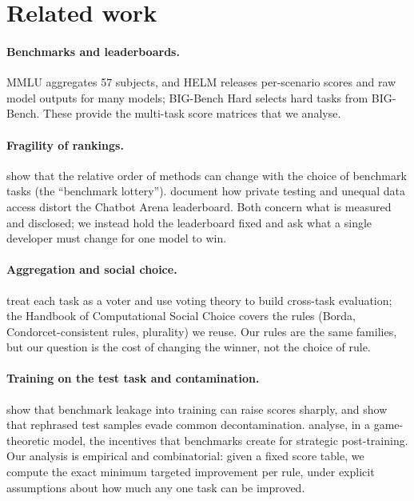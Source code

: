 \documentclass{article}
\begin{document}
\section{Related work}
\label{sec:related}
\paragraph{Benchmarks and leaderboards.}
MMLU \citep{hendrycks2021mmlu} aggregates 57 subjects, and HELM \citep{liang2023helm} releases per-scenario scores and raw model outputs for many models; BIG-Bench Hard \citep{suzgun2023bbh} selects hard tasks from BIG-Bench. These provide the multi-task score matrices that we analyse.

\paragraph{Fragility of rankings.}
\citet{dehghani2021lottery} show that the relative order of methods can change with the choice of benchmark tasks (the ``benchmark lottery''). \citet{singh2025illusion} document how private testing and unequal data access distort the Chatbot Arena leaderboard. Both concern what is measured and disclosed; we instead hold the leaderboard fixed and ask what a single developer must change for one model to win.

\paragraph{Aggregation and social choice.}
\citet{lanctot2025vase} treat each task as a voter and use voting theory to build cross-task evaluation; the Handbook of Computational Social Choice \citep{brandt2016handbook} covers the rules (Borda, Condorcet-consistent rules, plurality) we reuse. Our rules are the same families, but our question is the cost of changing the winner, not the choice of rule.

\paragraph{Training on the test task and contamination.}
\citet{zhou2023cheater} show that benchmark leakage into training can raise scores sharply, and \citet{yang2023rephrased} show that rephrased test samples evade common decontamination. \citet{chen2026incentives} analyse, in a game-theoretic model, the incentives that benchmarks create for strategic post-training. Our analysis is empirical and combinatorial: given a fixed score table, we compute the exact minimum targeted improvement per rule, under explicit assumptions about how much any one task can be improved.
\end{document}
